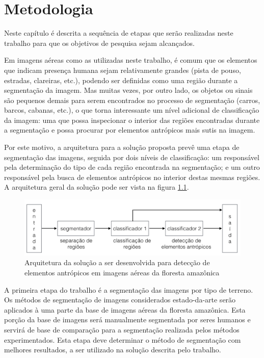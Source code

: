 \chapter{Metodologia}\label{cap:metodologia}


Neste capítulo é descrita a sequência de etapas que serão realizadas neste trabalho para que os objetivos de pesquisa sejam alcançados.

Em imagens aéreas como as utilizadas neste trabalho, é comum que os elementos que indicam presença humana sejam relativamente grandes (pista de pouso, estradas, clareiras, etc.), podendo ser definidas como uma região durante a segmentação da imagem. Mas muitas vezes, por outro lado, os objetos ou sinais são pequenos demais para serem encontrados no processo de segmentação (carros, barcos, cabanas, etc.), o que torna interessante um nível adicional de classificação da imagem: uma que possa inspecionar o interior das regiões encontradas durante a segmentação e possa procurar por elementos antrópicos mais sutis na imagem.

Por este motivo, a arquitetura para a solução proposta prevê uma etapa de segmentação das imagens, seguida por dois níveis de classificação: um responsável pela determinação do tipo de cada região encontrada na segmentação; e um outro responsável pela busca de elementos antrópicos no interior destas mesmas regiões. A arquitetura geral da solução pode ser vista na figura \ref{fig:metDiagrama}.

\begin{figure}[h]
    \includegraphics[width=\textwidth]{imgs/arquitetura}
    \caption{Arquitetura da solução a ser desenvolvida para detecção de elementos antrópicos em imagens aéreas da floresta amazônica}
    \label{fig:metDiagrama}
\end{figure}

A primeira etapa do trabalho é a segmentação das imagens por tipo de terreno. Os métodos de segmentação de imagens considerados estado-da-arte serão aplicados à uma parte da base de imagens aéreas da floresta amazônica. Esta porção da base de imagens será manualmente segmentada por seres humanos e servirá de base de comparação para a segmentação realizada pelos métodos experimentados. Esta etapa deve determinar o método de segmentação com melhores resultados, a ser utilizado na solução descrita pelo trabalho.

